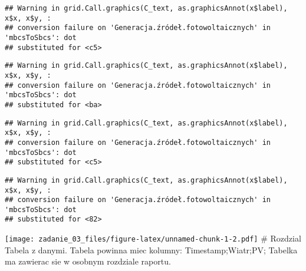 \documentclass[
]{article}
\begin{document}
\begin{verbatim}
## Warning in grid.Call.graphics(C_text, as.graphicsAnnot(x$label), x$x, x$y, :
## conversion failure on 'Generacja.źródeł.fotowoltaicznych' in 'mbcsToSbcs': dot
## substituted for <c5>
\end{verbatim}

\begin{verbatim}
## Warning in grid.Call.graphics(C_text, as.graphicsAnnot(x$label), x$x, x$y, :
## conversion failure on 'Generacja.źródeł.fotowoltaicznych' in 'mbcsToSbcs': dot
## substituted for <ba>
\end{verbatim}

\begin{verbatim}
## Warning in grid.Call.graphics(C_text, as.graphicsAnnot(x$label), x$x, x$y, :
## conversion failure on 'Generacja.źródeł.fotowoltaicznych' in 'mbcsToSbcs': dot
## substituted for <c5>
\end{verbatim}

\begin{verbatim}
## Warning in grid.Call.graphics(C_text, as.graphicsAnnot(x$label), x$x, x$y, :
## conversion failure on 'Generacja.źródeł.fotowoltaicznych' in 'mbcsToSbcs': dot
## substituted for <82>
\end{verbatim}

\texttt{[image: zadanie\_03\_files/figure-latex/unnamed-chunk-1-2.pdf]} \#
Rozdzial Tabela z danymi. Tabela powinna miec kolumny:
Timestamp;Wiatr;PV; Tabelka ma zawierac sie w osobnym rozdziale raportu.
\end{document}
